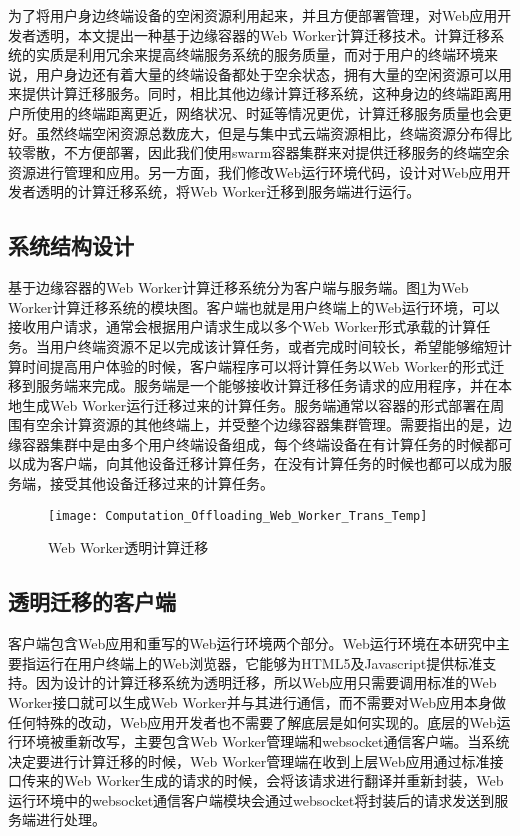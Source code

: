 为了将用户身边终端设备的空闲资源利用起来，并且方便部署管理，对Web应用开发者透明，本文提出一种基于边缘容器的Web Worker计算迁移技术。计算迁移系统的实质是利用冗余来提高终端服务系统的服务质量，而对于用户的终端环境来说，用户身边还有着大量的终端设备都处于空余状态，拥有大量的空闲资源可以用来提供计算迁移服务。同时，相比其他边缘计算迁移系统，这种身边的终端距离用户所使用的终端距离更近，网络状况、时延等情况更优，计算迁移服务质量也会更好。虽然终端空闲资源总数庞大，但是与集中式云端资源相比，终端资源分布得比较零散，不方便部署，因此我们使用swarm容器集群来对提供迁移服务的终端空余资源进行管理和应用。另一方面，我们修改Web运行环境代码，设计对Web应用开发者透明的计算迁移系统，将Web Worker迁移到服务端进行运行。
\subsection{系统结构设计}

基于边缘容器的Web Worker计算迁移系统分为客户端与服务端。图\ref{fig:computation_offloading_web_worker_trans}为Web Worker计算迁移系统的模块图。客户端也就是用户终端上的Web运行环境，可以接收用户请求，通常会根据用户请求生成以多个Web Worker形式承载的计算任务。当用户终端资源不足以完成该计算任务，或者完成时间较长，希望能够缩短计算时间提高用户体验的时候，客户端程序可以将计算任务以Web Worker的形式迁移到服务端来完成。服务端是一个能够接收计算迁移任务请求的应用程序，并在本地生成Web Worker运行迁移过来的计算任务。服务端通常以容器的形式部署在周围有空余计算资源的其他终端上，并受整个边缘容器集群管理。需要指出的是，边缘容器集群中是由多个用户终端设备组成，每个终端设备在有计算任务的时候都可以成为客户端，向其他设备迁移计算任务，在没有计算任务的时候也都可以成为服务端，接受其他设备迁移过来的计算任务。
\begin{figure}[!htbp]
    \centering
    \texttt{[image: Computation\_Offloading\_Web\_Worker\_Trans\_Temp]}
    \caption{Web Worker透明计算迁移}
    \label{fig:computation_offloading_web_worker_trans}
\end{figure}

\subsection{透明迁移的客户端}

客户端包含Web应用和重写的Web运行环境两个部分。Web运行环境在本研究中主要指运行在用户终端上的Web浏览器，它能够为HTML5及Javascript提供标准支持。因为设计的计算迁移系统为透明迁移，所以Web应用只需要调用标准的Web Worker接口就可以生成Web Worker并与其进行通信，而不需要对Web应用本身做任何特殊的改动，Web应用开发者也不需要了解底层是如何实现的。底层的Web运行环境被重新改写，主要包含Web Worker管理端和websocket通信客户端。当系统决定要进行计算迁移的时候，Web Worker管理端在收到上层Web应用通过标准接口传来的Web Worker生成的请求的时候，会将该请求进行翻译并重新封装，Web运行环境中的websocket通信客户端模块会通过websocket将封装后的请求发送到服务端进行处理。

